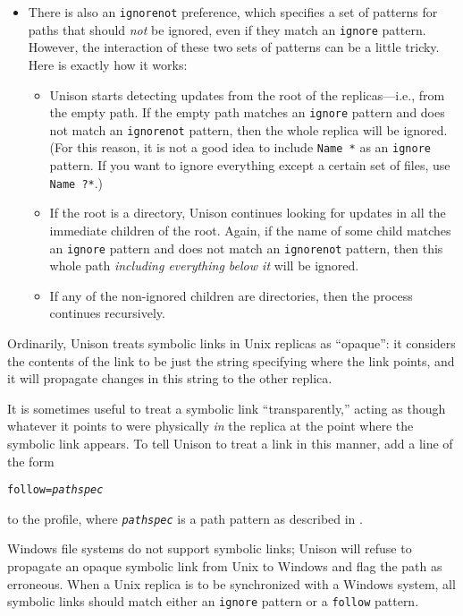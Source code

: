 \documentclass{article}
\newcommand{\ARG}[1]{\texttt{\textit{#1}}}
\begin{document}
\begin{itemize}
\item There is also an \verb|ignorenot| preference, which specifies a set of
  patterns for paths that should {\em not} be ignored, even if they match an
  \verb|ignore| pattern.  However, the interaction of these two sets of
  patterns can be a little tricky.  Here is exactly how it works:
  \begin{itemize}
  \item Unison starts detecting updates from the root of the
  replicas---i.e., from the empty path.  If the empty path matches an
  \verb|ignore| pattern and does not match an \verb|ignorenot| pattern, then
  the whole replica will be ignored.  (For this reason, it is not a good
  idea to include \verb|Name *| as an \verb|ignore| pattern.  If you want to
  ignore everything except a certain set of files, use \verb|Name ?*|.)
  \item If the root is a directory, Unison continues looking for updates in
  all the immediate children of the root.  Again, if the name of some child matches an
  \verb|ignore| pattern and does not match an \verb|ignorenot| pattern, then
  this whole path {\em including everything below it} will be ignored.  
  \item If any of the non-ignored children are directories, then the process
  continues recursively.
  \end{itemize}
\end{itemize} 


Ordinarily, Unison treats symbolic links in Unix replicas as
``opaque'': it considers the contents of the link to be just the
string specifying where the link points, and it will propagate changes in
this string to the other replica.

It is sometimes useful to treat a symbolic link ``transparently,''
acting as though whatever it points to were physically {\em in} the
replica at the point where the symbolic link appears.  To tell Unison
to treat a link in this manner, add a line of the form
\begin{alltt}
             follow = \ARG{pathspec}
\end{alltt}
to the profile, where \ARG{pathspec} is a path pattern as described in
.

Windows file systems do not support symbolic links; Unison will refuse
to propagate an opaque symbolic link from Unix to Windows and flag the
path as erroneous.  When a Unix replica is to be synchronized with a
Windows system, all symbolic links should match either an
\verb|ignore| pattern or a \verb|follow| pattern.
\end{document}
